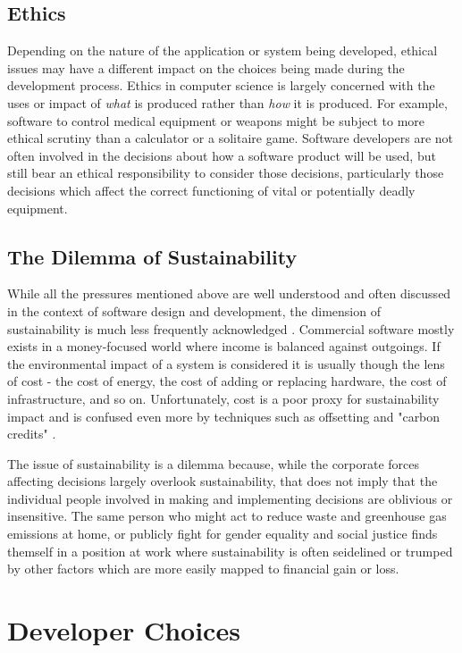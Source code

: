 \subsection{Ethics}
Depending on the nature of the application or system being developed, ethical issues may have a different impact on the choices being made during the development process. Ethics in computer science is largely concerned with the uses or impact of \emph{what} is produced rather than \emph{how} it is produced. For example, software to control medical equipment or weapons might be subject to more ethical scrutiny than a calculator or a solitaire game. Software developers are not often involved in the decisions about how a software product will be used, but still bear an ethical responsibility to consider those decisions, particularly those decisions which affect the correct functioning of vital or potentially deadly equipment.

\subsection{The Dilemma of Sustainability}
While all the pressures mentioned above are well understood and often discussed in the context of software design and development, the dimension of sustainability is much less frequently acknowledged . Commercial software mostly exists in a money-focused world where income is balanced against outgoings. If the environmental impact of a system is considered it is usually though the lens of cost - the cost of energy, the cost of adding or replacing hardware, the cost of infrastructure, and so on. Unfortunately, cost is a poor proxy for sustainability impact  and is confused even more by techniques such as offsetting and "carbon credits" .

The issue of sustainability is a dilemma because, while the corporate forces affecting decisions largely overlook sustainability, that does not imply that the individual people involved in making and implementing decisions are oblivious or insensitive. The same person who might act to reduce waste and greenhouse gas emissions at home, or publicly fight for gender equality and social justice finds themself in a position at work where sustainability is often seidelined or trumped by other factors which are more easily mapped to financial gain or loss.

\section{Developer Choices}
\label{section:developer choices}

